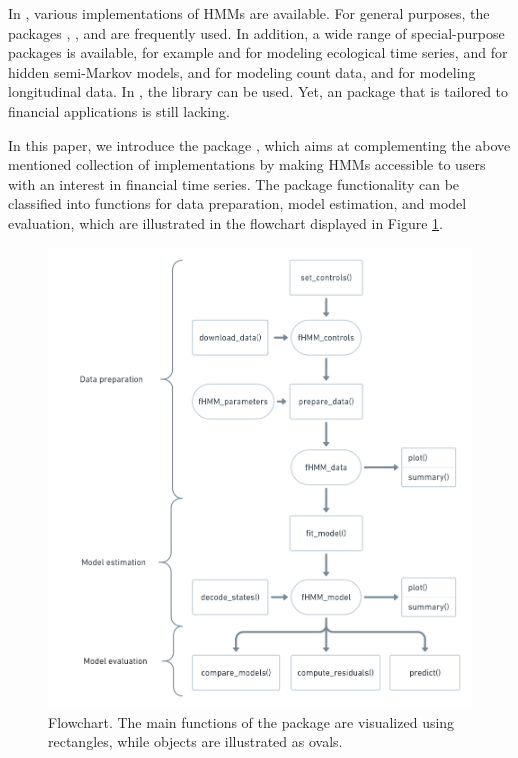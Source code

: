 \documentclass[article]{jss}
\begin{document}
In  \citep{r21}, various implementations of HMMs are available. For general purposes, the packages  \citep{him10},  \citep{vis10}, and  \citep{jac11} are frequently used. In addition, a wide range of special-purpose packages is available, for example  \citep{mic16} and  \citep{mcc18} for modeling ecological time series,  \citep{bul10} and  \citep{oco11} for hidden semi-Markov models,  \citep{tur14} and  \citep{ada19b} for modeling count data, and  \citep{bar17} for modeling longitudinal data. In , the library  \citep{leb22} can be used. Yet, an  package that is tailored to financial applications is still lacking.

In this paper, we introduce the  package  \citep{oel22}, which aims at complementing the above mentioned collection of implementations by making HMMs accessible to  users with an interest in financial time series. The package functionality can be classified into functions for data preparation, model estimation, and model evaluation, which are illustrated in the flowchart displayed in Figure \ref{fig:flowchart}. 
\begin{figure}[t!]
  \includegraphics{flowchart.png}
  \caption{Flowchart. The main functions of the  package are visualized using rectangles, while objects are illustrated as ovals.}
  \label{fig:flowchart}
\end{figure}
\end{document}
